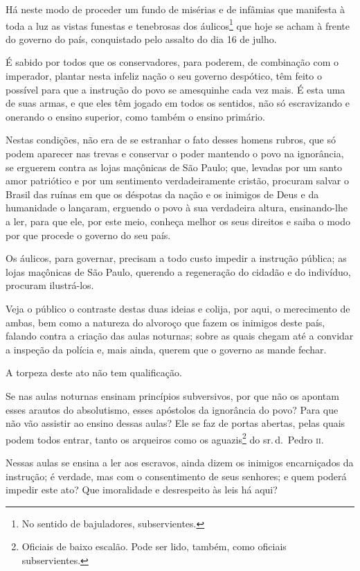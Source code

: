 Há neste modo de proceder um fundo de misérias e de infâmias que
manifesta à toda a luz as vistas funestas e tenebrosas dos
áulicos\footnote{No sentido de bajuladores, subservientes.} que hoje
se acham à frente do governo do país, conquistado pelo assalto do dia 16
de julho.

É sabido por todos que os conservadores, para poderem, de combinação com
o imperador, plantar nesta infeliz nação o seu governo despótico, têm
feito o possível para que a instrução do povo se amesquinhe cada vez
mais. É esta uma de suas armas, e que eles têm jogado em todos os
sentidos, não só escravizando e onerando o ensino superior, como também
o ensino primário.

Nestas condições, não era de se estranhar o fato desses homens rubros,
que só podem aparecer nas trevas e conservar o poder mantendo o povo na
ignorância, se erguerem contra as lojas maçônicas de São Paulo; que,
levadas por um santo amor patriótico e por um sentimento verdadeiramente
cristão, procuram salvar o Brasil das ruínas em que os déspotas da nação
e os inimigos de Deus e da humanidade o lançaram, erguendo o povo à sua
verdadeira altura, ensinando-lhe a ler, para que ele, por este meio,
conheça melhor os seus direitos e saiba o modo por que procede o governo
do seu país.

Os áulicos, para governar, precisam a todo custo impedir a instrução
pública; as lojas maçônicas de São Paulo, querendo a regeneração do
cidadão e do indivíduo, procuram ilustrá-los.

Veja o público o contraste destas duas ideias e colija, por aqui, o
merecimento de ambas, bem como a natureza do alvoroço que fazem os
inimigos deste país, falando contra a criação das aulas noturnas; sobre
as quais chegam até a convidar a inspeção da polícia e, mais ainda,
querem que o governo as mande fechar.

A torpeza deste ato não tem qualificação.

Se nas aulas noturnas ensinam princípios subversivos, por que não os
apontam esses arautos do absolutismo, esses apóstolos da ignorância do
povo? Para que não vão assistir ao ensino dessas aulas? Ele se faz de
portas abertas, pelas quais podem todos entrar, tanto os arqueiros como
os aguazis\footnote{Oficiais de baixo escalão. Pode ser lido, também,
  como oficiais subservientes.} do sr.\,d.~Pedro \textsc{ii}.

Nessas aulas se ensina a ler aos escravos, ainda dizem os inimigos
encarniçados da instrução; é verdade, mas com o consentimento de seus
senhores; e quem poderá impedir este ato? Que imoralidade e desrespeito
às leis há aqui?

